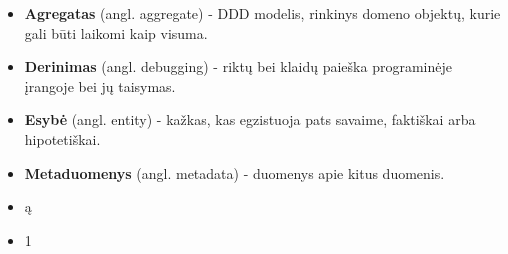 \begin{itemize}

	\item \textbf{Agregatas} (angl. aggregate) - DDD modelis, rinkinys domeno objektų, kurie gali būti laikomi kaip visuma.

	\item \textbf{Derinimas} (angl. debugging) - riktų bei klaidų paieška programinėje įrangoje bei jų taisymas.

	\item \textbf{Esybė} (angl. entity) - kažkas, kas egzistuoja pats savaime, faktiškai arba hipotetiškai.

	\item \textbf{Metaduomenys} (angl. metadata) - duomenys apie kitus duomenis.

	\item ą

	\item 1

\end{itemize}